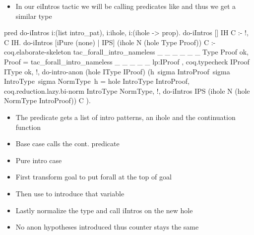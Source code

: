 \documentclass[thesis.tex]{subfiles}
\begin{document}
{{  \begin{itemize}
    \item In our eiIntros tactic we will be calling predicates like  and thus we get a similar type
  \end{itemize}
  \begin{elpicode}
  pred do-iIntros i:(list intro_pat), i:ihole, i:(ihole -> prop).
  do-iIntros [] IH C :- !, C IH.
  do-iIntros [iPure (none) | IPS] (ihole N (hole Type Proof)) C :-
    coq.elaborate-skeleton {{ tac_forall_intro_nameless _ _ _ _ _ _ }} Type Proof ok,
    Proof = {{ tac_forall_intro_nameless _ _ _ _ _ lp:IProof }},
    coq.typecheck IProof IType ok, !,
    do-intro-anon (hole IType IProof) (h\ sigma IntroProof\ sigma IntroType\ sigma NormType\
      h = hole IntroType IntroProof,
      coq.reduction.lazy.bi-norm IntroType NormType, !,
      do-iIntros IPS (ihole N (hole NormType IntroProof)) C
    ).
\end{elpicode}
  \begin{itemize}
    \item The predicate  gets a list of intro patterns, an ihole and the continuation function
    \item Base case calls the cont. predicate
    \item Pure intro case
    \item First transform goal to put forall at the top of goal
    \item Then use  to introduce that variable
    \item Lastly normalize the type and call iIntros on the new hole
    \item No anon \iris hypotheses introduced thus counter stays the same
  \end{itemize}


}}
\end{document}
